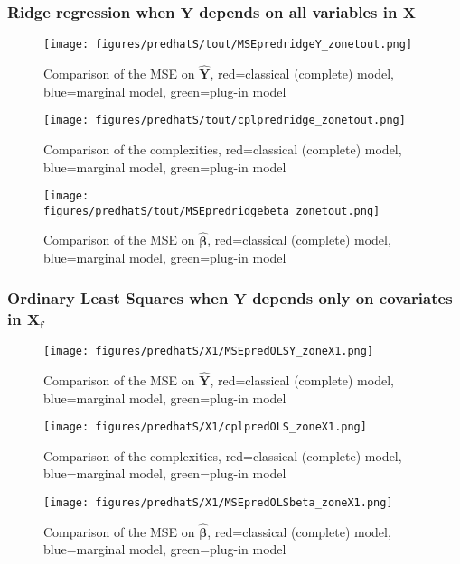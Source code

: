 \documentclass[12pt,a4paper]{report}
\begin{document}
\subsubsection{Ridge regression when $\boldsymbol{Y}$ depends on all variables in $\boldsymbol{X}$}

\begin{figure}[h!]
	\centering
		  \texttt{[image: figures/predhatS/tout/MSEpredridgeY\_zonetout.png]}
		\caption{Comparison of the MSE on $\hat{\boldsymbol{Y}}$, red=classical (complete) model, blue=marginal model, green=plug-in model}\label{MSEpredridgeY_zonetout}
	\end{figure}
	\begin{figure}[h!]
	\centering
		  \texttt{[image: figures/predhatS/tout/cplpredridge\_zonetout.png]}
		\caption{Comparison of the complexities, red=classical (complete) model, blue=marginal model, green=plug-in model}\label{cplpredridge_zonetout}
	\end{figure}
	\begin{figure}[h!]
	\centering
		  \texttt{[image: figures/predhatS/tout/MSEpredridgebeta\_zonetout.png]}
		\caption{Comparison of the MSE on $\hat{\boldsymbol{\beta}}$, red=classical (complete) model, blue=marginal model, green=plug-in model}\label{MSEpredridgebeta_zonetout}
	\end{figure}
	\FloatBarrier

\clearpage




\newpage
\subsubsection{Ordinary Least Squares when $\boldsymbol{Y}$ depends only on covariates in $\boldsymbol{X_f}$}

	\begin{figure}[h!]
	\centering
		  \texttt{[image: figures/predhatS/X1/MSEpredOLSY\_zoneX1.png]}
		\caption{Comparison of the MSE on $\hat{\boldsymbol{Y}}$, red=classical (complete) model, blue=marginal model, green=plug-in model}\label{MSEpredOLSY_zoneX1}
	\end{figure}
	\begin{figure}[h!]
	\centering
		  \texttt{[image: figures/predhatS/X1/cplpredOLS\_zoneX1.png]}
		\caption{Comparison of the complexities, red=classical (complete) model, blue=marginal model, green=plug-in model}\label{cplpredOLS_zoneX1}
	\end{figure}
	\begin{figure}[h!]
	\centering
		  \texttt{[image: figures/predhatS/X1/MSEpredOLSbeta\_zoneX1.png]}
		\caption{Comparison of the MSE on $\hat{\boldsymbol{\beta}}$, red=classical (complete) model, blue=marginal model, green=plug-in model}\label{MSEpredOLSbeta_zoneX1}
	\end{figure}
	\FloatBarrier
\newpage
\end{document}
